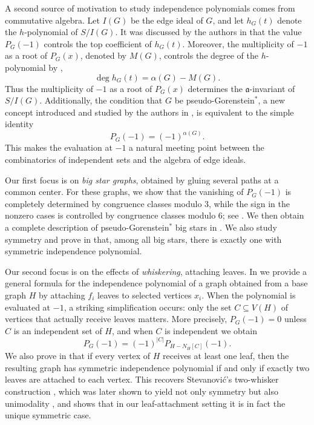 \documentclass[12pt]{amsart}
\theoremstyle{plain}
\theoremstyle{definition}
\begin{document}
A second source of motivation to study independence polynomials comes from commutative algebra. Let \(I(G)\) be the
edge ideal of \(G\), and let \(h_G(t)\) denote the \(h\)-polynomial of  \(S/I(G)\). It was discussed by the authors in \cite{hibi2026pseudogorensteingraphs} that the value \(P_G(-1)\) controls the top
coefficient of \(h_G(t)\). Moreover,  the multiplicity of \(-1\) as a root of \(P_G(x)\), denoted by $M(G)$,
controls the degree of the \(h\)-polynomial by \cite[Theorem~4.4]{biermann2026},
\[
\deg h_G(t)=\alpha(G)-M(G).
\]
Thus the multiplicity of \(-1\) as a root of \(P_G(x)\) determines the
\(\mathfrak a\)-invariant of \(S/I(G)\). Additionally, the condition that \(G\)
be pseudo-Gorenstein\(^*\), a new concept introduced and studied by the authors in \cite{hibi2026pseudogorensteingraphs}, is equivalent to the simple identity
\[
P_G(-1)=(-1)^{\alpha(G)}.
\]
This makes the evaluation at \(-1\) a natural meeting point between the
combinatorics of independent sets and the algebra of edge ideals.


Our first focus  is on \emph{big star graphs}, obtained by gluing several
paths at a common center. For these graphs, we show that the vanishing of
\(P_G(-1)\) is completely determined by congruence classes modulo \(3\), while the
sign in the nonzero cases is controlled by congruence classes modulo \(6\); see
. We then obtain a complete
description of pseudo-Gorenstein\(^*\) big stars in
. We also study symmetry and prove in
 that, among all big stars, there is exactly one with
symmetric independence polynomial.

Our second focus  is on the effects of \emph{whiskering}, attaching leaves. In
 we provide a general formula for the independence
polynomial of a graph obtained from a base graph \(H\) by attaching \(f_i\) leaves
to selected vertices \(x_i\). When the polynomial is evaluated at \(-1\), a
striking simplification occurs: only the set \(C\subseteq V(H)\) of vertices that
actually receive leaves matters. More precisely, \(P_G(-1)=0\) unless \(C\) is an
independent set of \(H\), and when \(C\) is independent we obtain
\[
P_G(-1)=(-1)^{|C|}P_{H-N_H[C]}(-1).
\]
We also prove in  that if every vertex of
\(H\) receives at least one leaf, then the resulting graph has symmetric
independence polynomial if and only if exactly two leaves are attached to each
vertex. This recovers Stevanović's two-whisker construction \cite{Stevanovic},
which was later shown to yield not only symmetry but also unimodality
\cite{Mandrescu2012}, and shows that in our leaf-attachment setting it is in fact
the unique symmetric case.
\end{document}
